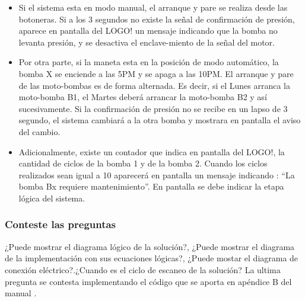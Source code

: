 \begin{itemize}
	\item Si el sistema esta en modo manual, el arranque y pare se realiza desde las botoneras. Si a los 3 segundos no existe la señal de confirmación de presión, aparece en pantalla del LOGO! un mensaje indicando que la bomba no levanta presión, y se desactiva el enclave-miento de  la señal del motor.
	\item Por otra parte, si la maneta esta en la posición de modo automático, la bomba X se enciende a las 5PM y se apaga a las 10PM. El arranque y pare de las moto-bombas es de forma alternada. Es decir, si el Lunes arranca la  moto-bomba B1, el Martes deberá arrancar la moto-bomba B2 y así sucesivamente. Si la confirmación de presión no se recibe en un lapso de 3 segundo, el sistema cambiará a la otra bomba y mostrara en pantalla el aviso del cambio.	
	\item Adicionalmente, existe un  contador que indica en pantalla del LOGO!, la cantidad de ciclos de la bomba 1 y de la bomba 2. Cuando los ciclos realizados sean igual a 10 aparecerá en pantalla un mensaje indicando : “La bomba Bx requiere mantenimiento”. En pantalla se debe indicar la etapa lógica del sistema.
\end{itemize} 




\subsubsection{Conteste las preguntas}
¿Puede mostrar el diagrama lógico de la solución?, ¿Puede mostrar el diagrama de la implementación con sus  ecuaciones lógicas?, ¿Puede mostar el diagrama de conexión eléctrico?.¿Cuando es el ciclo de escaneo de la solución? La ultima pregunta se contesta implementando el código que se aporta en apéndice B del manual \cite{LOGO1}.



